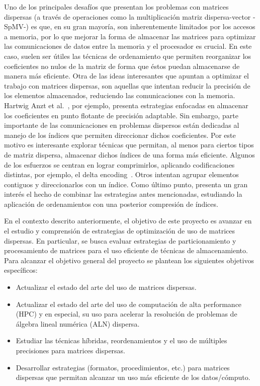 Uno de los principales desafíos que presentan los problemas con matrices dispersas (a través de operaciones como la multiplicación matriz dispersa-vector -SpMV-) es que, en su gran mayoría, son inherentemente limitados por los accesos a memoria, por lo que mejorar la forma de almacenar las matrices para optimizar las comunicaciones de datos entre la memoria y el procesador es crucial. En este caso, suelen ser útiles las técnicas de ordenamiento que permiten reorganizar los coeficientes no nulos de la matriz de forma que éstos puedan almacenarse de manera más eficiente. Otra de las ideas interesantes que apuntan a optimizar el trabajo con matrices dispersas, son aquellas que intentan reducir la precisión de los elementos almacenados, reduciendo las comunicaciones con la memoria. Hartwig Anzt et al.~\cite{Grtzmacher2019}, por ejemplo, presenta estrategias enfocadas en almacenar los coeficientes en punto flotante de precisión adaptable. Sin embargo, parte importante de las comunicaciones en problemas dispersos están dedicadas al manejo de los índices que permiten direccionar dichos coeficientes. Por este motivo es interesante explorar técnicas que permitan, al menos para ciertos tipos de matriz dispersa, almacenar dichos índices de una forma más eficiente. Algunos de los esfuerzos se centran en lograr comprimirlos, aplicando codificaciones distintas, por ejemplo, el delta encoding~\cite{smith1997}. Otros intentan agrupar elementos contiguos y direccionarlos con un índice. Como último punto, presenta un gran interés el hecho de combinar las estrategias antes mencionadas, estudiando la aplicación de ordenamientos  con una posterior compresión de índices.


En el contexto descrito anteriormente, el objetivo de este proyecto es avanzar en el estudio y comprensión de estrategias de optimización de uso de matrices dispersas. En particular, se busca evaluar estrategias de particionamiento y procesamiento de matrices para el uso eficiente de técnicas de almacenamiento. Para alcanzar el objetivo general del proyecto se plantean los siguientes objetivos específicos: 
\begin{itemize}
    \item Actualizar el estado del arte del uso de matrices dispersas.
    \item Actualizar el estado del arte del uso de computación de alta performance (HPC) y en especial, su uso para acelerar la resolución de problemas de álgebra lineal numérica (ALN) dispersa.
    \item Estudiar las técnicas híbridas, reordenamientos y el uso de múltiples precisiones para matrices dispersas.
    \item Desarrollar estrategias (formatos, procedimientos, etc.) para matrices dispersas que permitan alcanzar un uso más eficiente de los datos/cómputo.
\end{itemize}

